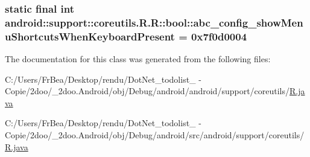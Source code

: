 \hypertarget{classandroid_1_1support_1_1coreutils_1_1_r_1_1bool_42f2debbdb4d4bf6ee61d0cd8c963a99}{
\subsubsection[{abc\_\-config\_\-showMenuShortcutsWhenKeyboardPresent}]{\setlength{\rightskip}{0pt plus 5cm}static final int android::support::coreutils.R.R::bool::abc\_\-config\_\-showMenuShortcutsWhenKeyboardPresent = 0x7f0d0004}}
\label{classandroid_1_1support_1_1coreutils_1_1_r_1_1bool_42f2debbdb4d4bf6ee61d0cd8c963a99}




The documentation for this class was generated from the following files:\begin{CompactItemize}
\item 
C:/Users/FrBea/Desktop/rendu/DotNet\_\-todolist\_ - Copie/2doo/\_\-2doo.Android/obj/Debug/android/android/support/coreutils/\hyperlink{android_2support_2coreutils_2_r_8java}{R.java}\item 
C:/Users/FrBea/Desktop/rendu/DotNet\_\-todolist\_ - Copie/2doo/\_\-2doo.Android/obj/Debug/android/src/android/support/coreutils/\hyperlink{src_2android_2support_2coreutils_2_r_8java}{R.java}\end{CompactItemize}
